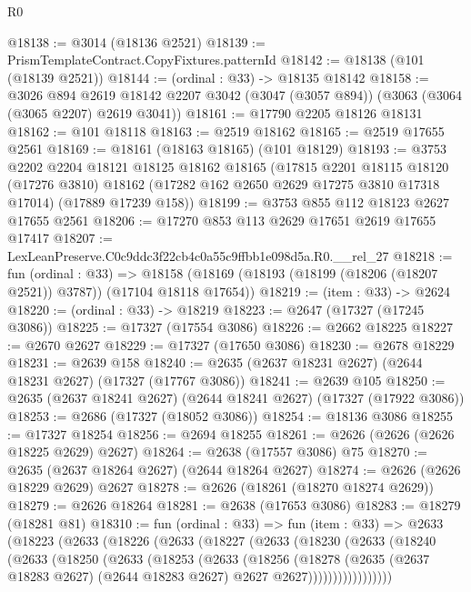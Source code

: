 \begin{lexlean}{R0}
\begin{coremodule}
@18138 := @3014 (@18136 @2521)
@18139 := PrismTemplateContract.CopyFixtures.patternId
@18142 := @18138 (@101 (@18139 @2521))
@18144 := (ordinal : @33) -> @18135 @18142
@18158 := @3026
    @894
    @2619
    @18142
    @2207
    @3042
    (@3047 (@3057 @894))
    (@3063 (@3064 (@3065 @2207) @2619 @3041))
@18161 := @17790 @2205 @18126 @18131
@18162 := @101 @18118
@18163 := @2519 @18162
@18165 := @2519 @17655 @2561
@18169 := @18161 (@18163 @18165) (@101 @18129)
@18193 := @3753
    @2202
    @2204
    @18121
    @18125
    @18162
    @18165
    (@17815
      @2201
      @18115
      @18120
      (@17276 @3810)
      @18162
      (@17282 @162 @2650 @2629 @17275 @3810 @17318 @17014)
      (@17889 @17239 @158))
@18199 := @3753 @855 @112 @18123 @2627 @17655 @2561
@18206 := @17270 @853 @113 @2629 @17651 @2619 @17655 @17417
@18207 := LexLeanPreserve.C0c9ddc3f22cb4c0a55c9ffbb1e098d5a.R0.__rel_27
@18218 := fun (ordinal : @33) =>
  @18158 (@18169 (@18193 (@18199 (@18206 (@18207 @2521)) @3787)) (@17104 @18118 @17654))
@18219 := (item : @33) -> @2624
@18220 := (ordinal : @33) -> @18219
@18223 := @2647 (@17327 (@17245 @3086))
@18225 := @17327 (@17554 @3086)
@18226 := @2662 @18225
@18227 := @2670 @2627
@18229 := @17327 (@17650 @3086)
@18230 := @2678 @18229
@18231 := @2639 @158
@18240 := @2635 (@2637 @18231 @2627) (@2644 @18231 @2627) (@17327 (@17767 @3086))
@18241 := @2639 @105
@18250 := @2635 (@2637 @18241 @2627) (@2644 @18241 @2627) (@17327 (@17922 @3086))
@18253 := @2686 (@17327 (@18052 @3086))
@18254 := @18136 @3086
@18255 := @17327 @18254
@18256 := @2694 @18255
@18261 := @2626 (@2626 (@2626 @18225 @2629) @2627)
@18264 := @2638 (@17557 @3086) @75
@18270 := @2635 (@2637 @18264 @2627) (@2644 @18264 @2627)
@18274 := @2626 (@2626 @18229 @2629) @2627
@18278 := @2626 (@18261 (@18270 @18274 @2629))
@18279 := @2626 @18264
@18281 := @2638 (@17653 @3086)
@18283 := @18279 (@18281 @81)
@18310 := fun (ordinal : @33) =>
  fun (item : @33) =>
  @2633
    (@18223
      (@2633
        (@18226
          (@2633
            (@18227
              (@2633
                (@18230
                  (@2633
                    (@18240
                      (@2633
                        (@18250
                          (@2633
                            (@18253
                              (@2633
                                (@18256
                                  (@18278
                                    (@2635
                                      (@2637 @18283 @2627)
                                      (@2644 @18283 @2627)
                                      @2627
                                      @2627)))))))))))))))))

\end{coremodule}
\end{lexlean}

